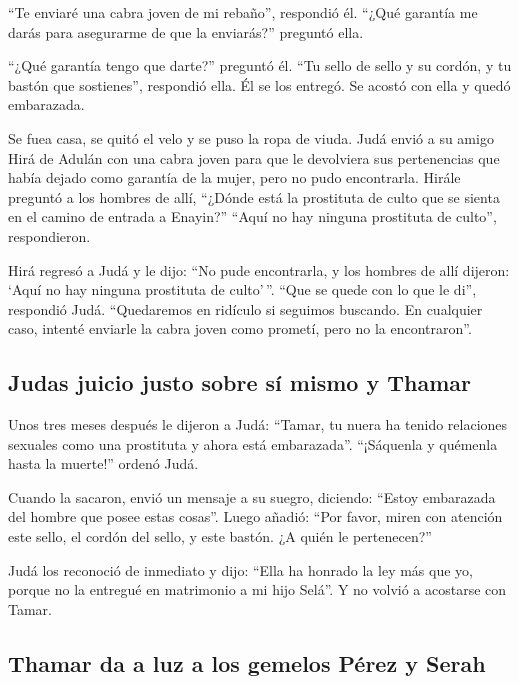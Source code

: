  ``Te enviaré una cabra joven de mi rebaño'', respondió
él. ``¿Qué garantía me darás para asegurarme de que la enviarás?''
preguntó ella.

 ``¿Qué garantía tengo que darte?'' preguntó él. ``Tu
sello de sello y su cordón, y tu bastón que sostienes'', respondió ella.
Él se los entregó. Se acostó con ella y quedó embarazada.

 Se fuea casa, se quitó el velo y se puso la ropa de
viuda.  Judá envió a su amigo Hirá de Adulán con una
cabra joven para que le devolviera sus pertenencias que había dejado
como garantía de la mujer, pero no pudo encontrarla. 
Hirále preguntó a los hombres de allí, ``¿Dónde está la prostituta de
culto que se sienta en el camino de entrada a Enayin?'' ``Aquí no hay
ninguna prostituta de culto'', respondieron.

 Hirá regresó a Judá y le dijo: ``No pude encontrarla, y
los hombres de allí dijeron: `Aquí no hay ninguna prostituta de
culto'\,''.  ``Que se quede con lo que le di'', respondió
Judá. ``Quedaremos en ridículo si seguimos buscando. En cualquier caso,
intenté enviarle la cabra joven como prometí, pero no la encontraron''.

\hypertarget{judas-juicio-justo-sobre-suxed-mismo-y-thamar}{%
\subsection{Judas juicio justo sobre sí mismo y
Thamar}\label{judas-juicio-justo-sobre-suxed-mismo-y-thamar}}

 Unos tres meses después le dijeron a Judá: ``Tamar, tu
nuera ha tenido relaciones sexuales como una prostituta y ahora está
embarazada''. ``¡Sáquenla y quémenla hasta la muerte!'' ordenó Judá.

 Cuando la sacaron, envió un mensaje a su suegro,
diciendo: ``Estoy embarazada del hombre que posee estas cosas''. Luego
añadió: ``Por favor, miren con atención este sello, el cordón del sello,
y este bastón. ¿A quién le pertenecen?''

 Judá los reconoció de inmediato y dijo: ``Ella ha
honrado la ley más que yo, porque no la entregué en matrimonio a mi hijo
Selá''. Y no volvió a acostarse con Tamar.

\hypertarget{thamar-da-a-luz-a-los-gemelos-puxe9rez-y-serah}{%
\subsection{Thamar da a luz a los gemelos Pérez y
Serah}\label{thamar-da-a-luz-a-los-gemelos-puxe9rez-y-serah}}

